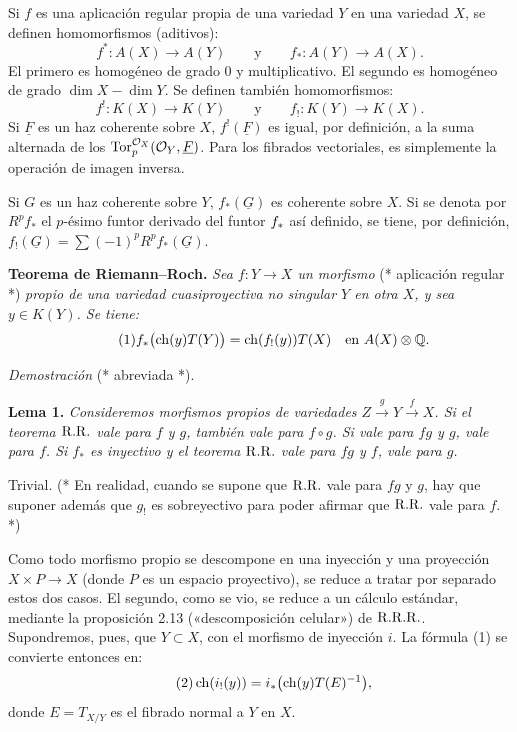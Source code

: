 Si \(f\) es una aplicación regular propia de una variedad \(Y\) en una variedad \(X\), se definen homomorfismos (aditivos):
\[
  f^*:A(X)\longrightarrow A(Y)\qquad\text{y}\qquad
  f_*:A(Y)\longrightarrow A(X).
\]
El primero es homogéneo de grado \(0\) y multiplicativo. El segundo es homogéneo de grado \(\dim X-\dim Y\). Se definen también homomorfismos:
\[
  f^!:K(X)\longrightarrow K(Y)\qquad\text{y}\qquad
  f_!:K(Y)\longrightarrow K(X).
\]
Si \(\underline F\) es un haz coherente sobre \(X\), \(f^!(\underline F)\) es igual, por definición, a la suma alternada de los \(\Tor_p^{\mathcal O_X}(\mathcal O_Y,\underline F)\). Para los fibrados vectoriales, es simplemente la operación de imagen inversa.

Si \(G\) es un haz coherente sobre \(Y\), \(f_*(\underline G)\) es coherente sobre \(X\). Si se denota por \(R^pf_*\) el \(p\)-ésimo funtor derivado del funtor \(\sisi{f}{f_*}\) así definido, se tiene, por definición, \(f_!(\underline G)=\sum(-1)^p R^pf_*(\underline G)\).\quad*

\textbf{Teorema de Riemann--Roch.} \emph{Sea \(f:Y\longrightarrow X\) un morfismo} (* aplicación regular *) \emph{propio de una variedad cuasiproyectiva no singular \(Y\) en otra \(X\), y sea \(y\in K(Y)\). Se tiene:}
\begin{equation}\tag{1}
  f_*\bigl(\ch(y)T(Y)\bigr)=\ch(f_!(y))T(X)
  \quad\text{en } A(X)\otimes\mathbb Q.
\end{equation}

\emph{Demostración} (* abreviada *).

\textbf{Lema 1.} \emph{Consideremos morfismos propios de variedades \(Z\xrightarrow{g}Y\xrightarrow{f}X\). Si el teorema \(\RR\) vale para \(f\) y \(g\), también vale para \(f\circ g\). Si vale para \(fg\) y \(g\), vale para \(f\). Si \(f_*\) es inyectivo y el teorema \(\RR\) vale para \(fg\) y \(f\), vale para \(g\).}

Trivial. (* En realidad, cuando se supone que \(\RR\) vale para \(fg\) y \(g\), hay que suponer además que \(g_!\) es sobreyectivo para poder afirmar que \(\RR\) vale para \(f\). *)

Como todo morfismo propio se descompone en una inyección y una proyección \(X\times P\longrightarrow X\) (donde \(P\) es un espacio proyectivo), se reduce a tratar por separado estos dos casos. El segundo, como se vio, se reduce a un cálculo estándar, mediante la proposición 2.13 («descomposición celular») de \(\RRR\). Supondremos, pues, que \(Y\subset X\), con el morfismo de inyección \(i\). La fórmula (1) se convierte entonces en:
\begin{equation}\tag{2}
  \ch(i_!(y))=i_*\bigl(\ch(y)T(E)^{-1}\bigr),
\end{equation}
donde \(E=T_{X/Y}\) es el fibrado normal a \(Y\) en \(X\).

